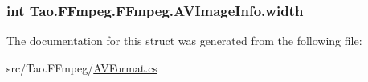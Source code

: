 \label{struct_tao_1_1_f_fmpeg_1_1_f_fmpeg_1_1_a_v_image_info_a5d35754aa35464fcb3a2b2ccbb8c4399}
\hypertarget{struct_tao_1_1_f_fmpeg_1_1_f_fmpeg_1_1_a_v_image_info_aad9c17eaa373f65aec87583287117e8a}{
\subsubsection[{width}]{\setlength{\rightskip}{0pt plus 5cm}int {\bf Tao.FFmpeg.FFmpeg.AVImageInfo.width}}}
\label{struct_tao_1_1_f_fmpeg_1_1_f_fmpeg_1_1_a_v_image_info_aad9c17eaa373f65aec87583287117e8a}


The documentation for this struct was generated from the following file:\begin{DoxyCompactItemize}
\item 
src/Tao.FFmpeg/\hyperlink{_a_v_format_8cs}{AVFormat.cs}\end{DoxyCompactItemize}
